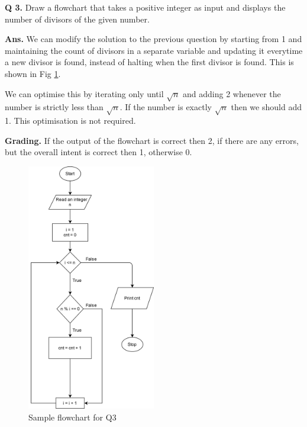 \documentclass{article}
\begin{document}
    \clearpage


\begin{flushleft}

    \textbf{Q 3. } Draw a flowchart that takes a positive integer as input and 
    displays the number of divisors of the given number.
    
    \end{flushleft}
    
    \begin{flushleft}
    
    \textbf{Ans. } We can modify the solution to the previous question by 
    starting from 1 and maintaining the count of divisors in a separate variable 
    and updating it everytime a new divisor is found, instead of halting when the 
    first divisor is found. This is shown in Fig \ref{Q3}.

    We can optimise this by iterating only until $\sqrt{n}$ and adding 2 whenever
    the number is strictly less than $\sqrt{n}$. If the number is exactly $\sqrt{n}$
    then we should add 1. This optimisation is not required.
    
    \end{flushleft}
    
    \begin{flushleft}
    
    \textbf{Grading. } If the output of the flowchart is correct then 2, if there are 
    any errors, but the overall intent is correct then 1, otherwise 0.
    
    \end{flushleft}
    
    \begin{figure}[ht]
        \centering
        \includegraphics[width=0.5\textwidth]{Q3.png}
        \caption{Sample flowchart for Q3}
        \label{Q3}
    \end{figure}
    
\end{document}
